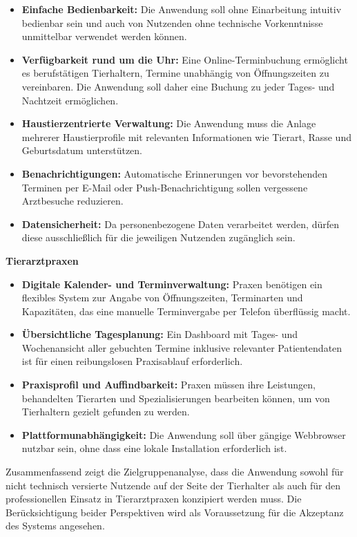 \begin{itemize}
    \item \textbf{Einfache Bedienbarkeit:} Die Anwendung soll ohne Einarbeitung intuitiv bedienbar sein und auch von Nutzenden ohne technische Vorkenntnisse unmittelbar verwendet werden können.
    \item \textbf{Verfügbarkeit rund um die Uhr:} Eine Online-Terminbuchung ermöglicht es berufstätigen Tierhaltern, Termine unabhängig von Öffnungszeiten zu vereinbaren. Die Anwendung soll daher eine Buchung zu jeder Tages- und Nachtzeit ermöglichen.
    \item \textbf{Haustierzentrierte Verwaltung:} Die Anwendung muss die Anlage mehrerer Haustierprofile mit relevanten Informationen wie Tierart, Rasse und Geburtsdatum unterstützen.
    \item \textbf{Benachrichtigungen:} Automatische Erinnerungen vor bevorstehenden Terminen per E-Mail oder Push-Benachrichtigung sollen vergessene Arztbesuche reduzieren.
    \item \textbf{Datensicherheit:} Da personenbezogene Daten verarbeitet werden, dürfen diese ausschließlich für die jeweiligen Nutzenden zugänglich sein.
\end{itemize}

\textbf{Tierarztpraxen}

\begin{itemize}
    \item \textbf{Digitale Kalender- und Terminverwaltung:} Praxen benötigen ein flexibles System zur Angabe von Öffnungszeiten, Terminarten und Kapazitäten, das eine manuelle Terminvergabe per Telefon überflüssig macht.
    \item \textbf{Übersichtliche Tagesplanung:} Ein Dashboard mit Tages- und Wochenansicht aller gebuchten Termine inklusive relevanter Patientendaten ist für einen reibungslosen Praxisablauf erforderlich.
    \item \textbf{Praxisprofil und Auffindbarkeit:} Praxen müssen ihre Leistungen, behandelten Tierarten und Spezialisierungen bearbeiten können, um von Tierhaltern gezielt gefunden zu werden.
    \item \textbf{Plattformunabhängigkeit:} Die Anwendung soll über gängige Webbrowser nutzbar sein, ohne dass eine lokale Installation erforderlich ist.
\end{itemize}

Zusammenfassend zeigt die Zielgruppenanalyse, dass die Anwendung sowohl für nicht technisch versierte Nutzende auf der Seite der Tierhalter als auch für den professionellen Einsatz in Tierarztpraxen konzipiert werden muss. Die Berücksichtigung beider Perspektiven wird als Voraussetzung für die Akzeptanz des Systems angesehen.

